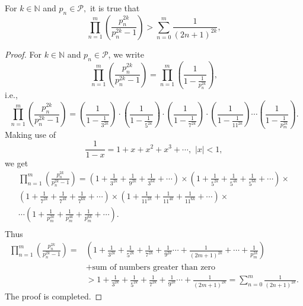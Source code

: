 \documentclass[10pt,a4paper]{amsart}
\begin{document}
\begin{proposition}\label{prop2.2}
For $k \in \mathbb{N} $ and $p_n \in \mathcal{P},$ it is true that
$$ \prod_{n=1}^m \left(\frac{p_n^{2k}}{p_n^{2k}-1}\right) > \sum_{n=0}^m \frac{1}{(2n+1)^{2k}}, $$  
\end{proposition}

\begin{proof}
For $k \in \mathbb{N} $ and $p_n \in \mathcal{P}$, we write
$$ \prod_{n=1}^m \left(\frac{p_n^{2k}}{p_n^{2k}-1}\right) = \prod_{n=1}^m \left(\frac{1}{1-\frac{1}{p_n^{2k}}}\right), $$ i.e.,
$$\prod_{n=1}^m \left(\frac{p_n^{2k}}{p_n^{2k}-1}\right) = \left(\frac{1}{1-\frac{1}{3^{2k}}}\right) \cdot \left(\frac{1}{1-\frac{1}{5^{2k}}}\right) \cdot \left(\frac{1}{1-\frac{1}{7^{2k}}}\right) \cdot \left(\frac{1}{1-\frac{1}{11^{2k}}}\right) \cdots \left(\frac{1}{1-\frac{1}{p_m^{2k}}}\right).$$ Making use of $$ \frac{1}{1-x} = 1 + x + x^2 + x^3 + \cdots, \, \, \vert x \vert < 1, $$ we get
\begin{multline}\nonumber
\prod_{n=1}^m \left(\frac{p_n^{2k}}{p_n^{2k}-1}\right) = \left( 1 + \frac{1}{3^{2k}} + \frac{1}{9^{2k}} + \frac{1}{3^{6k}} + \cdots \right) \times \left( 1 + \frac{1}{5^{2k}} + \frac{1}{5^{4k}} + \frac{1}{5^{6k}} + \cdots \right) \times  \\ 
\left( 1 + \frac{1}{7^{2k}} + \frac{1}{7^{4k}} + \frac{1}{7^{6k}} + \cdots \right) \times \left( 1 + \frac{1}{11^{2k}} + \frac{1}{11^{4k}} + \frac{1}{11^{6k}} + \cdots \right) \times \\
\cdots \left( 1 + \frac{1}{p_m^{2k}} + \frac{1}{p_m^{4k}} + \frac{1}{p_m^{6k}} + \cdots \right).\\
\end{multline}
Thus 
\begin{align*}
\prod_{n=1}^m \left(\frac{p_n^{2k}}{p_n^{2k}-1}\right) = &\left(1 + \frac{1}{3^{2k}} + \frac{1}{5^{2k}} + \frac{1}{7^{2k}} + \frac{1}{9^{2k}} \cdots + \frac{1}{(2m+1)^{2k}} + \cdots + \frac{1}{p_m^{2k}}\right) \\
&+ \text{sum of numbers greater than zero} \\
&> 1 + \frac{1}{3^{2k}} + \frac{1}{5^{2k}} + \frac{1}{7^{2k}} + \frac{1}{9^{2k}} \cdots + \frac{1}{(2m+1)^{2k}} = \sum_{n=0}^m \frac{1}{(2n+1)^{2k}}.
\end{align*}
The proof is completed.
\end{proof}
\end{document}
